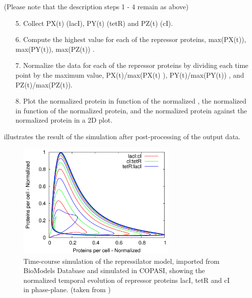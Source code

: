 (Please note that the description steps 1 - 4 remain as above)
\begin{enumerate}
\item[5.]{Collect PX(t) (lacI), PY(t) (tetR) and PZ(t) (cI).}
\item[6.]{Compute the highest value for each of the repressor proteins,  max(PX(t)), max(PY(t)), max(PZ(t)) .}
\item[7.]{Normalize the data for each of the repressor proteins by dividing each time point by the maximum value, \ie PX(t)/max(PX(t) ), PY(t)/max(PY(t)) , and PZ(t)/max(PZ(t)).}
\item[8.]{Plot the normalized  protein in function of the normalized , the normalized  in function of the normalized  protein, and the normalized  protein against the normalized  protein in a 2D plot.}
\end{enumerate}
 illustrates the result of the simulation after post-processing of the output data. 
\begin{figure}
\centering
\includegraphics[width=0.7\textwidth]{images/simEx2.png}
\caption{Time-course simulation of the repressilator model, imported from BioModels Database and simulated in COPASI, showing the normalized temporal evolution of repressor proteins lacI, tetR and cI in phase-plane. (taken from \citep{Waltemath:2010})}
\label{fig:simEx2}
\end{figure}
%

